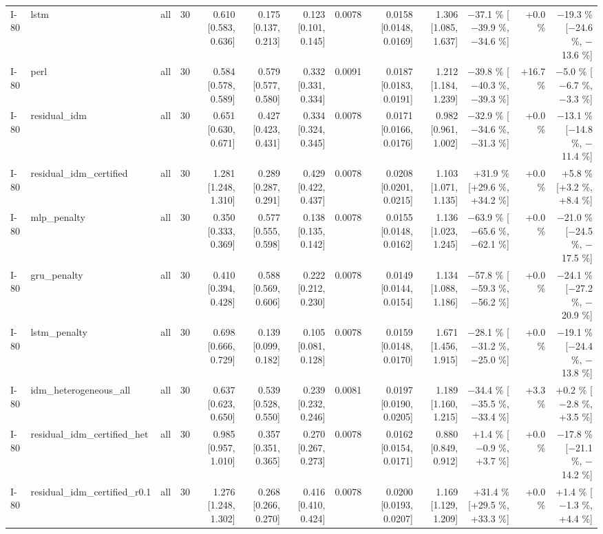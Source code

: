 \begin{table}[htbp]
{\begin{tabular}{lllrrrrrrrrrr}
I-80 & lstm & all & 30 & 0.610 [0.583, 0.636] & 0.175 [0.137, 0.213] & 0.123 [0.101, 0.145] & 0.0078 & 0.0158 [0.0148, 0.0169] & 1.306 [1.085, 1.637] & $-$37.1 \% [$-$39.9 \%, $-$34.6 \%] & +0.0 \% & $-$19.3 \% [$-$24.6 \%, $-$13.6 \%] \\
I-80 & perl & all & 30 & 0.584 [0.578, 0.589] & 0.579 [0.577, 0.580] & 0.332 [0.331, 0.334] & 0.0091 & 0.0187 [0.0183, 0.0191] & 1.212 [1.184, 1.239] & $-$39.8 \% [$-$40.3 \%, $-$39.3 \%] & +16.7 \% & $-$5.0 \% [$-$6.7 \%, $-$3.3 \%] \\
I-80 & residual\_idm & all & 30 & 0.651 [0.630, 0.671] & 0.427 [0.423, 0.431] & 0.334 [0.324, 0.345] & 0.0078 & 0.0171 [0.0166, 0.0176] & 0.982 [0.961, 1.002] & $-$32.9 \% [$-$34.6 \%, $-$31.3 \%] & +0.0 \% & $-$13.1 \% [$-$14.8 \%, $-$11.4 \%] \\
I-80 & residual\_idm\_certified & all & 30 & 1.281 [1.248, 1.310] & 0.289 [0.287, 0.291] & 0.429 [0.422, 0.437] & 0.0078 & 0.0208 [0.0201, 0.0215] & 1.103 [1.071, 1.135] & +31.9 \% [+29.6 \%, +34.2 \%] & +0.0 \% & +5.8 \% [+3.2 \%, +8.4 \%] \\
I-80 & mlp\_penalty & all & 30 & 0.350 [0.333, 0.369] & 0.577 [0.555, 0.598] & 0.138 [0.135, 0.142] & 0.0078 & 0.0155 [0.0148, 0.0162] & 1.136 [1.023, 1.245] & $-$63.9 \% [$-$65.6 \%, $-$62.1 \%] & +0.0 \% & $-$21.0 \% [$-$24.5 \%, $-$17.5 \%] \\
I-80 & gru\_penalty & all & 30 & 0.410 [0.394, 0.428] & 0.588 [0.569, 0.606] & 0.222 [0.212, 0.230] & 0.0078 & 0.0149 [0.0144, 0.0154] & 1.134 [1.088, 1.186] & $-$57.8 \% [$-$59.3 \%, $-$56.2 \%] & +0.0 \% & $-$24.1 \% [$-$27.2 \%, $-$20.9 \%] \\
I-80 & lstm\_penalty & all & 30 & 0.698 [0.666, 0.729] & 0.139 [0.099, 0.182] & 0.105 [0.081, 0.128] & 0.0078 & 0.0159 [0.0148, 0.0170] & 1.671 [1.456, 1.915] & $-$28.1 \% [$-$31.2 \%, $-$25.0 \%] & +0.0 \% & $-$19.1 \% [$-$24.4 \%, $-$13.8 \%] \\
I-80 & idm\_heterogeneous\_all & all & 30 & 0.637 [0.623, 0.650] & 0.539 [0.528, 0.550] & 0.239 [0.232, 0.246] & 0.0081 & 0.0197 [0.0190, 0.0205] & 1.189 [1.160, 1.215] & $-$34.4 \% [$-$35.5 \%, $-$33.4 \%] & +3.3 \% & +0.2 \% [$-$2.8 \%, +3.5 \%] \\
I-80 & residual\_idm\_certified\_het & all & 30 & 0.985 [0.957, 1.010] & 0.357 [0.351, 0.365] & 0.270 [0.267, 0.273] & 0.0078 & 0.0162 [0.0154, 0.0171] & 0.880 [0.849, 0.912] & +1.4 \% [$-$0.9 \%, +3.7 \%] & +0.0 \% & $-$17.8 \% [$-$21.1 \%, $-$14.2 \%] \\
I-80 & residual\_idm\_certified\_r0.1 & all & 30 & 1.276 [1.248, 1.302] & 0.268 [0.266, 0.270] & 0.416 [0.410, 0.424] & 0.0078 & 0.0200 [0.0193, 0.0207] & 1.169 [1.129, 1.209] & +31.4 \% [+29.5 \%, +33.3 \%] & +0.0 \% & +1.4 \% [$-$1.3 \%, +4.4 \%] \\

\end{tabular}}
\end{table}
